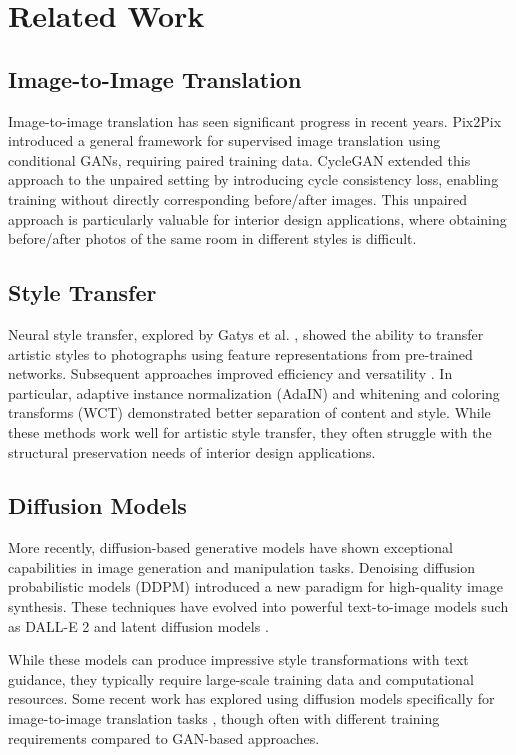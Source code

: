 \documentclass[twocolumn,superscriptaddress,aps]{revtex4-1}
\begin{document}
\section{Related Work}

\subsection{Image-to-Image Translation}
Image-to-image translation has seen significant progress in recent years. Pix2Pix \cite{isola2017image} introduced a general framework for supervised image translation using conditional GANs, requiring paired training data. CycleGAN \cite{zhu2017unpaired} extended this approach to the unpaired setting by introducing cycle consistency loss, enabling training without directly corresponding before/after images. This unpaired approach is particularly valuable for interior design applications, where obtaining before/after photos of the same room in different styles is difficult.

\subsection{Style Transfer}
Neural style transfer, explored by Gatys et al. \cite{gatys2016image}, showed the ability to transfer artistic styles to photographs using feature representations from pre-trained networks. Subsequent approaches improved efficiency \cite{johnson2016perceptual} and versatility \cite{huang2017arbitrary}. In particular, adaptive instance normalization (AdaIN) \cite{huang2017arbitrary} and whitening and coloring transforms (WCT) \cite{li2017universal} demonstrated better separation of content and style. While these methods work well for artistic style transfer, they often struggle with the structural preservation needs of interior design applications.

\subsection{Diffusion Models}
More recently, diffusion-based generative models have shown exceptional capabilities in image generation and manipulation tasks. Denoising diffusion probabilistic models (DDPM) \cite{ho2020denoising} introduced a new paradigm for high-quality image synthesis. These techniques have evolved into powerful text-to-image models such as DALL-E 2 \cite{ramesh2022hierarchical} and latent diffusion models \cite{rombach2022high}. 

While these models can produce impressive style transformations with text guidance, they typically require large-scale training data and computational resources. Some recent work has explored using diffusion models specifically for image-to-image translation tasks \cite{saharia2022palette}, though often with different training requirements compared to GAN-based approaches.
\end{document}
